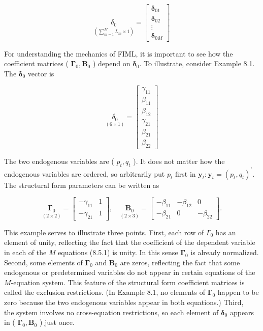 \documentclass[10pt]{article}
\begin{document}
\[
\underset{\left(\sum_{m=1}^{M} L_{m} \times 1\right)}{\delta_{0}}=\left[\begin{array}{c}
\boldsymbol{\delta}_{01}  \tag{8.5.12}\\
\boldsymbol{\delta}_{02} \\
\vdots \\
\boldsymbol{\delta}_{0 M}
\end{array}\right]
\]

For understanding the mechanics of FIML, it is important to see how the coefficient matrices ( $\boldsymbol{\Gamma}_{0}, \mathbf{B}_{0}$ ) depend on $\boldsymbol{\delta}_{0}$. To illustrate, consider Example 8.1. The $\boldsymbol{\delta}_{0}$ vector is

\[
\underset{(6 \times 1)}{\delta_{0}}=\left[\begin{array}{c}
\gamma_{11}  \tag{8.5.13}\\
\beta_{11} \\
\beta_{12} \\
\gamma_{21} \\
\beta_{21} \\
\beta_{22}
\end{array}\right]
\]

The two endogenous variables are ( $p_{t}, q_{t}$ ). It does not matter how the endogenous variables are ordered, so arbitrarily put $p_{t}$ first in $\mathbf{y}_{t}: \mathbf{y}_{t}=\left(p_{t}, q_{t}\right)^{\prime}$. The structural form parameters can be written as

\[
\underset{(2 \times 2)}{\boldsymbol{\Gamma}_{0}}=\left[\begin{array}{ll}
-\gamma_{11} & 1  \tag{8.5.14}\\
-\gamma_{21} & 1
\end{array}\right], \quad \underset{(2 \times 3)}{\mathbf{B}_{0}}=\left[\begin{array}{ccc}
-\beta_{11} & -\beta_{12} & 0 \\
-\beta_{21} & 0 & -\beta_{22}
\end{array}\right] .
\]

This example serves to illustrate three points. First, each row of $\Gamma_{0}$ has an element of unity, reflecting the fact that the coefficient of the dependent variable in each of the $M$ equations (8.5.1) is unity. In this sense $\boldsymbol{\Gamma}_{0}$ is already normalized. Second, some elements of $\boldsymbol{\Gamma}_{0}$ and $\mathbf{B}_{0}$ are zeros, reflecting the fact that some endogenous or predetermined variables do not appear in certain equations of the $M$-equation system. This feature of the structural form coefficient matrices is called the exclusion restrictions. (In Example 8.1, no elements of $\boldsymbol{\Gamma}_{0}$ happen to be zero because the two endogenous variables appear in both equations.) Third,\\
the system involves no cross-equation restrictions, so each element of $\boldsymbol{\delta}_{0}$ appears in ( $\boldsymbol{\Gamma}_{0}, \mathbf{B}_{0}$ ) just once.
\end{document}
